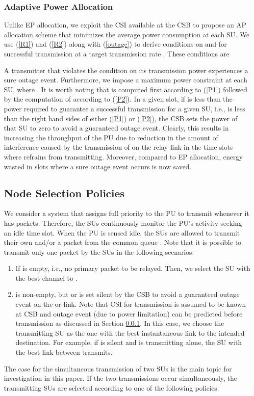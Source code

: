 \documentclass[journal,twocolumn]{IEEEtran}
\begin{document}
\subsubsection{Adaptive Power Allocation}
\label{AP}
Unlike EP allocation, we exploit the CSI available at the CSB to propose an AP allocation scheme that minimizes the average power consumption
at each SU. We use (\ref{R1}) and (\ref{R2}) along with (\ref{outage}) to derive conditions on  and  for successful transmission at a target transmission rate .
These conditions are

A transmitter that violates the condition on its transmission power experiences a sure outage event. Furthermore, we impose a maximum power constraint at each SU, where . It is worth noting that  is computed first according to (\ref{P1}) followed by the computation of  according to (\ref{P2}). In a given slot, if  is less
than the power required to guarantee a successful transmission for a given SU, i.e.,  is less than the right hand sides of either (\ref{P1}) or (\ref{P2}), the CSB sets the power of that SU to zero to avoid a guaranteed outage event. Clearly, this results in increasing the throughput of the PU due to reduction in the amount of interference caused by the transmission of  on the relay link in the time slots where  refrains from transmitting. Moreover, compared to EP allocation, energy wasted in slots where a sure outage event occurs is now saved. 


\subsection{Node Selection Policies}\label{node_selection}
We consider a system that assigns full priority to the PU to transmit whenever it has packets. Therefore, the SUs continuously monitor the PU's
activity seeking an idle time slot. When the PU is sensed idle, the SUs are allowed to transmit their own and/or a packet from the common queue . Note that it is possible to transmit only one packet by the SUs in the following scenarios:
\begin{enumerate}
  \item If  is empty, i.e., no primary packet to be relayed. Then, we select the SU with the best channel to .
  \item  is non-empty, but  or  is set silent by the CSB to avoid a guaranteed outage event on the  or  link. Note that CSI for transmission is assumed to be known at CSB and outage event (due to power limitation) can be predicted before transmission as discussed in Section \ref{AP}. In this case, we choose the transmitting SU as the one with the best instantaneous link to the intended destination. For example, if  is silent and  is transmitting alone, the SU with the best link
    between  transmits.
\end{enumerate}
The case for the simultaneous transmission of two SUs is the main topic for investigation in this paper. If the two transmissions occur simultaneously, the transmitting SUs are selected according to one of the following policies.
\end{document}

